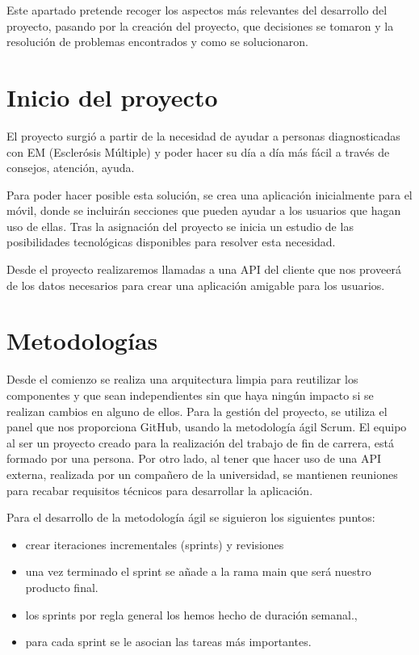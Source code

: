 
Este apartado pretende recoger los aspectos más relevantes del desarrollo del proyecto, pasando por la creación del proyecto, que decisiones se tomaron y la resolución de 
problemas encontrados y como se solucionaron.

\section{Inicio del proyecto}
El proyecto surgió a partir de la necesidad de ayudar a personas diagnosticadas con EM (Esclerósis Múltiple) y poder hacer su día a día más fácil a través de consejos, atención, ayuda.

Para poder hacer posible esta solución, se crea una aplicación inicialmente para el móvil, donde se incluirán secciones que pueden ayudar a los usuarios que hagan uso de ellas. Tras la asignación del proyecto se inicia un estudio de las posibilidades tecnológicas disponibles para resolver esta necesidad.

Desde el proyecto realizaremos llamadas a una API del cliente que nos proveerá de los datos necesarios para crear una aplicación amigable para los usuarios.

\section{Metodologías}
Desde el comienzo se realiza una arquitectura limpia para reutilizar los componentes y que sean independientes sin que haya ningún impacto si se realizan cambios en alguno de ellos.
Para la gestión del proyecto, se utiliza el panel que nos proporciona GitHub, usando la metodología ágil Scrum. El equipo al ser un proyecto creado para la realización del trabajo de fin de carrera, está formado por una persona. Por otro lado, al tener que hacer uso de una API externa, realizada por un compañero de la universidad, se mantienen reuniones para recabar requisitos técnicos para desarrollar la aplicación.

Para el desarrollo de la metodología ágil se siguieron los siguientes puntos:
\begin{itemize}
\item crear iteraciones incrementales (sprints) y revisiones
\item una vez terminado el sprint se añade a la rama main que será nuestro producto final.
\item los sprints por regla general los hemos hecho de duración semanal.,
\item para cada sprint se le asocian las tareas más importantes.
\end{itemize}

